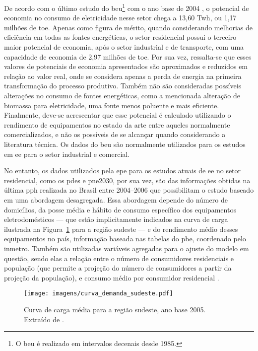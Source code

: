 De acordo com o último estudo do \gls{beu}\footnote{O \gls{beu} é
realizado em intervalos decenais desde 1985.} com o ano base de 2004
\cite{beu}, o potencial de economia no consumo de eletricidade nesse
setor chega a 13,60 T\acs{wh}, ou 1,17 milhões de \acs{toe}.
Apenas como figura de mérito, quando considerando melhorias de
eficiência em todas as fontes energéticas, o setor residencial possui
o terceiro maior potencial de economia, após o setor industrial e de
transporte, com uma capacidade de economia de 2,97 milhões de
\acs{toe}. Por sua vez, ressalta-se que esses valores de
potenciais de economia apresentados são aproximados e reduzidos em
relação ao valor real, onde se considera apenas a perda de energia na
primeira transformação do processo produtivo. Também não são
consideradas possíveis alterações no consumo de fontes energéticas,
como a mencionada alteração de biomassa para eletricidade, uma fonte
menos poluente e mais eficiente. Finalmente, deve-se acrescentar que
esse potencial é calculado utilizando o rendimento de equipamentos no
estado da arte entre aqueles normalmente comercializados, e não os
possíveis de se alcançar quando considerando a literatura técnica. Os
dados  do \gls{beu} são normalmente utilizados para os estudos em
\gls{ee} para o setor industrial e comercial.

No entanto, os dados utilizados pela \gls{epe} para os estudos atuais
de \gls{ee} no setor residencial, como os \glspl{pde} e \gls{pne2030},
por sua vez, são das informações obtidas na última \gls{pph} realizada
no Brasil entre 2004--2006 que possibilitam o estudo baseado em uma
abordagem desagregada. Essa abordagem depende do número de domicílios,
da posse média e hábito de consumo específico dos equipamentos
eletrodomésticos --- que estão implicitamente indicados na curva de
carga ilustrada na Figura~\ref{fig:curva_carga} para a região sudeste
--- e do rendimento médio desses equipamentos no país, informação
baseada nas tabelas do \gls{pbe}, coordenado pelo \gls{inmetro}.
Também são utilizadas variáveis agregadas para o ajuste do modelo em
questão, sendo elas a relação entre o número de consumidores
residenciais e população (que permite a projeção do número de
consumidores a partir da projeção da população), e consumo médio por
consumidor residencial
\cite{epe_eficiencia_2012,pde_2020,pne30_eff_energ}. 

\begin{figure}[h!t]
\centering
\texttt{[image: imagens/curva\_demanda\_sudeste.pdf]}
\caption[Curva de carga média para a região sudeste, ano base 2005.]{Curva de
carga média para a região sudeste, ano base 2005. Extraído de
\cite{result_procel_2005}.}
\label{fig:curva_carga}
\end{figure}

